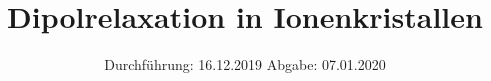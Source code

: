 

\subject{V48}
\title{Dipolrelaxation in Ionenkristallen}
\date{%
  Durchführung: 16.12.2019
  \hspace{3em}
  Abgabe: 07.01.2020
}



\maketitle
\thispagestyle{empty}
\tableofcontents
\newpage






\printbibliography{}


